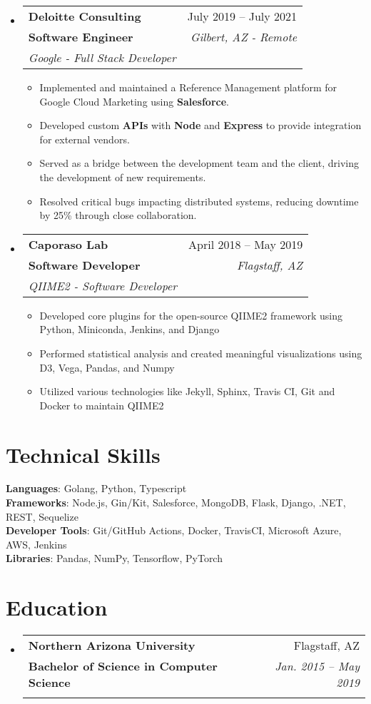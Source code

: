 \documentclass[letterpaper,11pt]{article}
\makeatletter
\newcommand{\resumeItem}[1]{
  \item\small{
    {#1 \vspace{-2pt}}
  }
}
\newcommand{\resumeSubheading}[5]{
  \vspace{-2pt}\item
    \begin{tabular*}{0.97\textwidth}[t]{l@{\extracolsep{\fill}}r}
      \textbf{#1} & #2 \\
      \textbf{\small#3} & \textit{\small #4} \\
      \textit{\small#5} \\
    \end{tabular*}\vspace{-7pt}
}
\newcommand{\resumeSubHeadingListStart}{\begin{itemize}[leftmargin=0.15in, label={}]}
\newcommand{\resumeSubHeadingListEnd}{\end{itemize}}
\newcommand{\resumeItemListStart}{\begin{itemize}}
\newcommand{\resumeItemListEnd}{\end{itemize}\vspace{-5pt}}
\makeatother
\begin{document}
\resumeSubHeadingListStart
\resumeSubheading
{Deloitte Consulting}{July 2019 -- July 2021}
{Software Engineer}{Gilbert, AZ - Remote}
{Google - Full Stack Developer}
\resumeItemListStart
\resumeItem{Implemented and maintained a Reference Management platform for Google Cloud Marketing using \textbf{Salesforce}.}
\resumeItem{Developed custom \textbf{APIs} with \textbf{Node} and \textbf{Express} to provide integration for external vendors.}
\resumeItem{Served as a bridge between the development team and the client, driving the development of new requirements.}
\resumeItem{Resolved critical bugs impacting distributed systems, reducing downtime by 25\% through close collaboration.}
\resumeItemListEnd
\resumeSubHeadingListEnd



\resumeSubHeadingListStart
\resumeSubheading
{Caporaso Lab}{April 2018 -- May 2019}
{Software Developer}{Flagstaff, AZ}
{QIIME2 - Software Developer}
\resumeItemListStart
\resumeItem{Developed core plugins for the open-source QIIME2 framework using Python, Miniconda, Jenkins, and Django}
\resumeItem{Performed statistical analysis and created meaningful visualizations using D3, Vega, Pandas, and Numpy}
\resumeItem{Utilized various technologies like Jekyll, Sphinx, Travis CI, Git and Docker to maintain QIIME2}
\resumeItemListEnd
\resumeSubHeadingListEnd


\section{Technical Skills}
\begin{itemize}[leftmargin=0.15in, label={}]
 \small{\item{
       \textbf{Languages}{: Golang, Python, Typescript} \\
       \textbf{Frameworks}{: Node.js, Gin/Kit, Salesforce, MongoDB, Flask, Django, .NET, REST, Sequelize} \\
       \textbf{Developer Tools}{: Git/GitHub Actions, Docker, TravisCI, Microsoft Azure, AWS, Jenkins} \\
       \textbf{Libraries}{: Pandas, NumPy, Tensorflow, PyTorch}
       }}
\end{itemize}

\section{Education}
\resumeSubHeadingListStart
\resumeSubheading
{Northern Arizona University}{Flagstaff, AZ}
{\normalfont Bachelor of Science in Computer Science}{Jan. 2015 -- May 2019}
{}
\resumeSubHeadingListEnd

\end{document}
